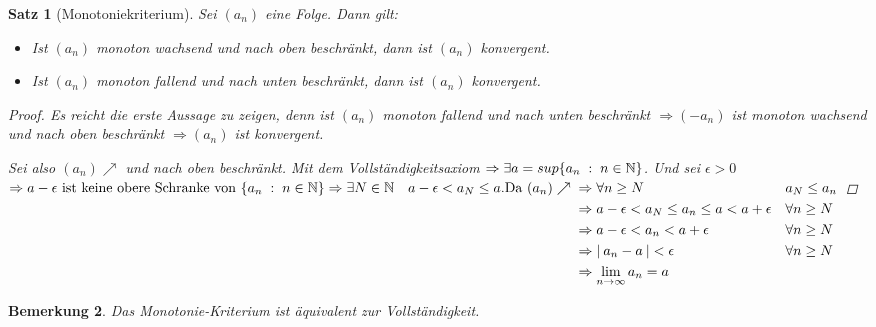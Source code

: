 \documentclass[a4paper,titlepage,oneside]{article}
\def\N{\ensuremath{\mathbb{N}} }
\def\sp{\hspace{0,1cm}}
\renewcommand{\liminf}[2][n]{\ensuremath{\lim\limits_{#1 \rightarrow \infty}{#2}}}
\newcommand{\abs}[1]{\ensuremath{\left|\:#1\:\right|}}
\newcommand{\menge}[2]{\ensuremath{\{#1\sp : \sp #2\}}}
\theoremstyle{thmstyle}
\newtheorem{satz}{Satz}[subsection]
\newtheorem{bem}[satz]{Bemerkung}
\begin{document}
\begin{satz}[Monotoniekriterium]
Sei $(a_n)$ eine Folge. Dann gilt: 
\begin{itemize}
\item Ist $(a_n)$ monoton wachsend und nach oben beschränkt, dann ist $(a_n)$ konvergent.
\item Ist $(a_n)$ monoton fallend  und nach unten beschränkt, dann ist $(a_n)$ konvergent.
\end{itemize}
\begin{proof}
Es reicht die erste Aussage zu zeigen, denn ist $(a_n)$ monoton fallend und nach unten beschränkt \( \Rightarrow (-a_n)\) ist monoton wachsend und nach oben beschränkt $\Rightarrow (a_n) $ ist konvergent.

Sei also \((a_n) \nearrow \) und nach oben beschränkt. Mit dem Vollständigkeitsaxiom \(\Rightarrow \exists a = sup\menge{a_n}{n \in \N}\). Und sei $\epsilon > 0$ 
\begin{math}
\Rightarrow a - \epsilon \text{ ist keine obere Schranke von } \menge{a_n}{n \in \N} \Rightarrow \exists N \in \N \quad a-\epsilon < a_N \le a.\\
\text{Da }(a_n) \nearrow \begin{aligned}[t] 
					&\Rightarrow \forall n \ge N 						&& a_N \le a_n \\
					&\Rightarrow a-\epsilon < a_N \le a_n \le a < a+\epsilon 	&& \forall n \ge N \\
					&\Rightarrow a-\epsilon < a_n < a+\epsilon 			&& \forall n \ge N \\
					&\Rightarrow \abs{a_n - a} < \epsilon					&& \forall n \ge N \\
					&\Rightarrow \liminf{a_n} = a \end{aligned}\end{math}
\end{proof}
\end{satz}

\begin{bem}
Das Monotonie-Kriterium ist äquivalent zur Vollständigkeit.
\end{bem}
\end{document}
